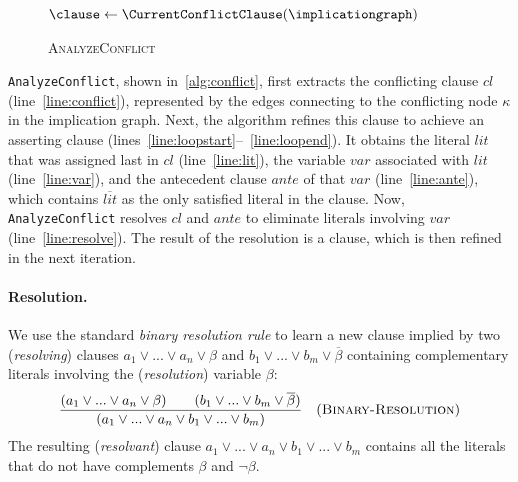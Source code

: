 \documentclass[oneside,11pt,dvipsnames]{book}
\numberwithin{equation}{section}
\theoremstyle{definition}
\theoremstyle{remark}
\begin{document}
\begin{figure}
\begin{minipage}{\linewidth}
\vspace{-0.2in}
\begin{algorithm}[H]
    \small
    \Output{\clause}
    \BlankLine
    $\clause \gets \CurrentConflictClause(\implicationgraph)$\;\label{line:conflict}
    \While{$\neg \StopCriterion(\clause)$}{\label{line:loopstart}
      $\literal \gets \LastAssignedLiteral(\implicationgraph, \clause)$\;\label{line:lit}
      $\variable \gets \LiteralToVariable(\literal)$\;\label{line:var}
      $\antecedent \gets \Antecedent(\implicationgraph,\literal)$\;\label{line:ante}
      $\clause \gets \BinRes(\clause, \antecedent, \variable)$\;\label{line:resolve}
    }\label{line:loopend}
    \Return{$\clause$}
    \caption{\textsc{AnalyzeConflict}}\label{alg:conflict}
  \end{algorithm}
  \end{minipage}
\end{figure}
\texttt{AnalyzeConflict}, shown in~\autoref{alg:conflict}, first extracts the conflicting clause $cl$ (line~\ref{line:conflict}), represented by the edges connecting to the conflicting node $\kappa$ in the implication graph.
Next, the algorithm refines this clause to achieve an asserting clause (lines~\ref{line:loopstart}--~\ref{line:loopend}).
It obtains the literal $lit$ that was assigned last in $cl$ (line~\ref{line:lit}), the variable $var$ associated with $lit$ (line~\ref{line:var}), and the antecedent clause $ante$ of that $var$ (line~\ref{line:ante}), which contains $\overline{lit}$ as the only satisfied literal in the clause. Now, \texttt{AnalyzeConflict} resolves $cl$ and $ante$ to eliminate literals involving $var$ (line~\ref{line:resolve}). The result of the resolution is a clause, which is then refined in the next iteration.

\paragraph{Resolution.} We use the standard \emph{binary resolution rule} to learn a new clause implied by two (\emph{resolving}) clauses $a_1 \lor ... \lor a_n \lor \beta$ and $b_1 \lor ... \lor b_m \lor \overline{\beta}$ containing complementary literals involving the (\emph{resolution}) variable $\beta$:
\begin{equation} \label{eq:binary-resolution}
    \frac{(a_1 \lor ... \lor a_n \lor \beta) \quad \quad (b_1 \lor ... \lor b_m \lor \overline{\beta})}{(a_1 \lor ... \lor a_n \lor b_1 \lor ... \lor b_m)} \quad  (\textsc{Binary-Resolution})
\end{equation}
The resulting (\emph{resolvant}) clause $a_1 \lor ... \lor a_n \lor b_1 \lor ... \lor b_m$ contains all the literals that do not have complements $\beta$ and $\neg{\beta}$.
\end{document}
